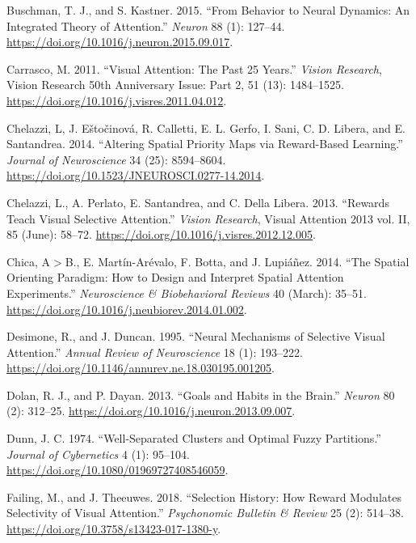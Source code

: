 \documentclass[11pt,halfline,a4paper,]{ouparticle}
\newlength{\cslhangindent}
\newenvironment{cslreferences}%
  {\setlength{\parindent}{0pt}%
  \everypar{\setlength{\hangindent}{\cslhangindent}}\ignorespaces}%
  {\par}
\begin{document}
\begin{cslreferences}
\leavevmode\hypertarget{ref-buschmanBehaviorNeuralDynamics2015}{}%
Buschman, T. J., and S. Kastner. 2015. ``From Behavior to Neural Dynamics: An Integrated Theory of Attention.'' \emph{Neuron} 88 (1): 127--44. \url{https://doi.org/10.1016/j.neuron.2015.09.017}.

\leavevmode\hypertarget{ref-carrascoVisualAttention252011a}{}%
Carrasco, M. 2011. ``Visual Attention: The Past 25 Years.'' \emph{Vision Research}, Vision Research 50th Anniversary Issue: Part 2, 51 (13): 1484--1525. \url{https://doi.org/10.1016/j.visres.2011.04.012}.

\leavevmode\hypertarget{ref-chelazziAlteringSpatialPriority2014}{}%
Chelazzi, L, J. Eštočinová, R. Calletti, E. L. Gerfo, I. Sani, C. D. Libera, and E. Santandrea. 2014. ``Altering Spatial Priority Maps via Reward-Based Learning.'' \emph{Journal of Neuroscience} 34 (25): 8594--8604. \url{https://doi.org/10.1523/JNEUROSCI.0277-14.2014}.

\leavevmode\hypertarget{ref-chelazziRewardsTeachVisual2013a}{}%
Chelazzi, L., A. Perlato, E. Santandrea, and C. Della Libera. 2013. ``Rewards Teach Visual Selective Attention.'' \emph{Vision Research}, Visual Attention 2013 vol. II, 85 (June): 58--72. \url{https://doi.org/10.1016/j.visres.2012.12.005}.

\leavevmode\hypertarget{ref-chicaSpatialOrientingParadigm2014a}{}%
Chica, A\(>\)B., E. Martín-Arévalo, F. Botta, and J. Lupiáñez. 2014. ``The Spatial Orienting Paradigm: How to Design and Interpret Spatial Attention Experiments.'' \emph{Neuroscience \& Biobehavioral Reviews} 40 (March): 35--51. \url{https://doi.org/10.1016/j.neubiorev.2014.01.002}.

\leavevmode\hypertarget{ref-desimoneNeuralMechanismsSelective1995a}{}%
Desimone, R., and J. Duncan. 1995. ``Neural Mechanisms of Selective Visual Attention.'' \emph{Annual Review of Neuroscience} 18 (1): 193--222. \url{https://doi.org/10.1146/annurev.ne.18.030195.001205}.

\leavevmode\hypertarget{ref-dolanGoalsHabitsBrain2013}{}%
Dolan, R. J., and P. Dayan. 2013. ``Goals and Habits in the Brain.'' \emph{Neuron} 80 (2): 312--25. \url{https://doi.org/10.1016/j.neuron.2013.09.007}.

\leavevmode\hypertarget{ref-dunn+WellSeparatedClustersOptimal1974}{}%
Dunn\textdagger, J. C. 1974. ``Well-Separated Clusters and Optimal Fuzzy Partitions.'' \emph{Journal of Cybernetics} 4 (1): 95--104. \url{https://doi.org/10.1080/01969727408546059}.

\leavevmode\hypertarget{ref-failingSelectionHistoryHow2018}{}%
Failing, M., and J. Theeuwes. 2018. ``Selection History: How Reward Modulates Selectivity of Visual Attention.'' \emph{Psychonomic Bulletin \& Review} 25 (2): 514--38. \url{https://doi.org/10.3758/s13423-017-1380-y}.


\end{cslreferences}
\end{document}

